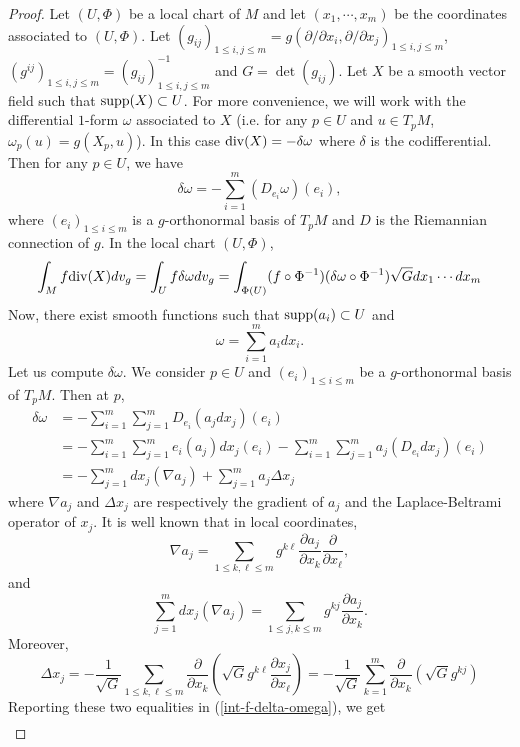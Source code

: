 \documentclass[12pt,english]{smfart} %
\theoremstyle{remark}
\begin{document}
\begin{proof} Let $(U,\Phi)$ be a local chart of $M$ and let $(x_1,\cdots,x_m)$ be the coordinates associated to $(U,\Phi)$. Let $(g_{ij})_{1\leqslant i,j\leqslant m}=g\left(\partial/\partial x_i,\partial/\partial x_j\right)_{1\leqslant i,j\leqslant m}$, $(g^{ij})_{1\leqslant i,j\leqslant m}=(g_{ij})_{1\leqslant i,j\leqslant m}^{-1}$ and $G=\det(g_{ij})$. Let $X$ be a smooth vector field such that ${\rm supp}(X)\subset U$. For more convenience, we will work with the differential $1$-form $\omega$ associated to $X$ (i.e. for any $p\in U$ and $u\in T_pM$, $\omega_p(u)=g(X_p,u)$). In this case ${\rm div}(X)=-\delta\omega$ where $\delta$ is the codifferential. Then for any $p\in U$, we have 
$$\delta\omega=-\sum_{i=1}^m(D_{e_i}\omega)(e_i),$$
where $(e_i)_{1\leqslant i\leqslant m}$ is a $g$-orthonormal basis of $T_pM$ and $D$ is the Riemannian connection of $g$. In the local chart $(U,\Phi)$,
\begin{align}\label{int-f-delta-omega}
    \int_Mf{\rm div}(X)dv_g=\int_Uf\delta\omega dv_g=\int_{\Phi(U)}(f\circ\Phi^{-1})(\delta\omega\circ\Phi^{-1})\sqrt{G}dx_1\cdots dx_m
\end{align}
Now, there exist smooth functions such that ${\rm supp}(a_i)\subset U$ and $$\omega=\displaystyle\sum_{i=1}^ma_idx_i.$$ Let us compute $\delta\omega$. We consider $p\in U$ and $(e_i)_{1\leqslant i\leqslant m}$ be a $g$-orthonormal basis of $T_pM$. Then at $p$,
\begin{align*}
\delta\omega&=-\sum_{i=1}^m\sum_{j=1}^m D_{e_i}(a_jdx_j)(e_i)\\
&=-\sum_{i=1}^m\sum_{j=1}^me_i(a_j)dx_j(e_i)-\sum_{i=1}^m\sum_{j=1}^ma_j(D_{e_i}dx_j)(e_i)\\
&=-\sum_{j=1}^mdx_j(\nabla a_j)+\sum_{j=1}^ma_j\Delta x_j
\end{align*}
where $\nabla a_j$ and $\Delta x_j$ are respectively the gradient of $a_j$ and the Laplace-Beltrami operator of $x_j$. It is well known that in local coordinates,
$$\nabla a_j=\sum_{1\leqslant k,\ell\leqslant m}g^{k\ell}\frac{\partial a_j}{\partial x_k}\frac{\partial}{\partial x_{\ell}},$$
and 
$$\sum_{j=1}^mdx_j(\nabla a_j)=\sum_{1\leqslant j,k\leqslant m}g^{kj}\frac{\partial a_j}{\partial x_k}.$$
Moreover,
$$\Delta x_j=-\frac{1}{\sqrt{G}}\sum_{1\leqslant k,\ell\leqslant m}\frac{\partial}{\partial x_k}\left(\sqrt{G}g^{k\ell}\frac{\partial x_j}{\partial x_{\ell}}\right)=-\frac{1}{\sqrt{G}}\sum_{k=1}^m\frac{\partial}{\partial x_k}(\sqrt{G}g^{kj})$$
Reporting these two equalities in (\ref{int-f-delta-omega}), we get
\begin{align*}

\end{align*}
\end{proof}
\end{document}
